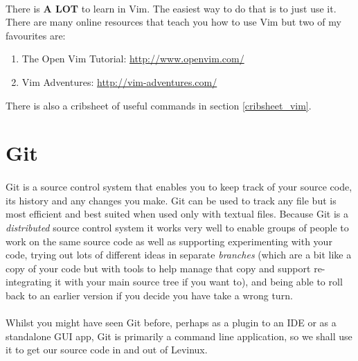 \documentclass[12pt, a4paper, twoside]{book}
\begin{document}
\paragraph{} There is \textbf{A LOT} to learn in Vim. The easiest way to do that is to just use it. There are many online resources that teach you how to use Vim but two of my favourites are:
\begin{enumerate}
\item The Open Vim Tutorial: \url{http://www.openvim.com/}
\item Vim Adventures: \url{http://vim-adventures.com/}
\end{enumerate}

There is also a cribsheet of useful commands in section \ref{cribsheet_vim}.

\section{Git}
\label{git}
\paragraph{} Git is a source control system that enables you to keep track of your source code, its history and any changes you make. Git can be used to track any file but is most efficient and best suited when used only with textual files. Because Git is a \emph{distributed} source control system it works very well to enable groups of people to work on the same source code as well as supporting experimenting with your code, trying out lots of different ideas in separate \emph{branches} (which are a bit like a copy of your code but with tools to help manage that copy and support re-integrating it with your main source tree if you want to), and being able to roll back to an earlier version if you decide you have take a wrong turn.

\paragraph{} Whilst you might have seen Git before, perhaps as a plugin to an IDE or as a standalone GUI app, Git is primarily a command line application, so we shall use it to get our source code in and out of Levinux.
\end{document}
